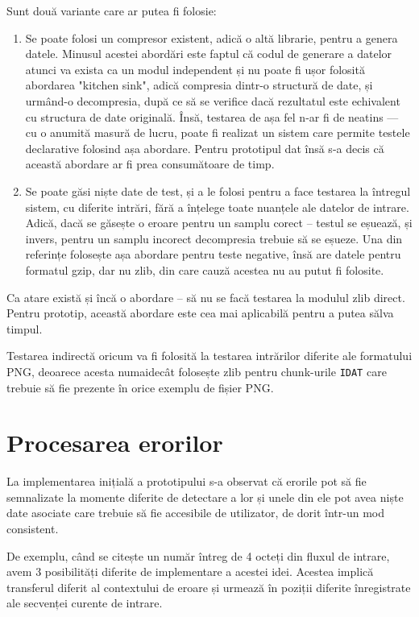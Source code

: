 \documentclass[a4paper,12pt]{report}
\begin{document}
Sunt două variante care ar putea fi folosie:
\begin{enumerate}
    \item
        Se poate folosi un compresor existent, adică o altă librarie, pentru a genera datele.
        Minusul acestei abordări este faptul că codul de generare a datelor atunci va exista
        ca un modul independent și nu poate fi ușor folosită abordarea "kitchen sink", adică
        compresia dintr-o structură de date, și urmând-o decompresia, după ce să se verifice
        dacă rezultatul este echivalent cu structura de date originală.
        Însă, testarea de așa fel n-ar fi de neatins --- cu o anumită masură de lucru,
        poate fi realizat un sistem care permite testele declarative folosind așa abordare.
        Pentru prototipul dat însă s-a decis că această abordare ar fi prea consumătoare de timp.
    \item
        Se poate găsi niște date de test, și a le folosi pentru a face testarea
        la întregul sistem, cu diferite intrări, fără a înțelege toate nuanțele ale datelor de intrare.
        Adică, dacă se găsește o eroare pentru un samplu corect -- testul se eșuează,
        și invers, pentru un samplu incorect decompresia trebuie să se eșueze.
        Una din referințe \cite{gzip_impl} folosește așa abordare pentru teste negative,
        însă are datele pentru formatul gzip, dar nu zlib, din care cauză acestea nu au putut fi folosite.
\end{enumerate}

Ca atare există și încă o abordare -- să nu se facă testarea la modulul zlib direct.
Pentru prototip, această abordare este cea mai aplicabilă pentru a putea sălva timpul.

Testarea indirectă oricum va fi folosită la testarea intrărilor diferite ale formatului \ac{PNG},
deoarece acesta numaidecât folosește zlib pentru chunk-urile \texttt{IDAT} care trebuie să fie prezente
în orice exemplu de fișier \ac{PNG}.

\section{Procesarea erorilor}

La implementarea inițială a prototipului s-a observat că erorile pot să fie semnalizate
la momente diferite de detectare a lor și unele din ele pot avea niște date asociate
care trebuie să fie accesibile de utilizator, de dorit într-un mod consistent.

De exemplu, când se citește un număr întreg de 4 octeți din fluxul de intrare,
avem 3 posibilități diferite de implementare a acestei idei.
Acestea implică transferul diferit al contextului de eroare și
urmează în poziții diferite înregistrate ale secvenței curente de intrare.
\end{document}
